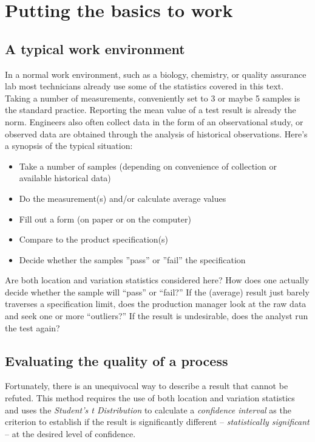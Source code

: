 \chapter{Putting the basics to work}

\section{A typical work environment}
In a normal work environment, such as a biology, chemistry, or quality assurance lab most technicians already use some of the statistics covered in this text.  Taking a number of measurements, conveniently set to 3 or maybe 5 samples is the standard practice.  Reporting the mean value of a test result is already the norm.  Engineers also often collect data in the form of an observational study, or observed data are obtained through the analysis of historical observations.
Here's a synopsis of the typical situation:
\begin{center}
  \begin{itemize}
  \item Take a number of samples (depending on convenience of collection or available historical data)
  \item Do the measurement(s) and/or calculate average values
  \item Fill out a form (on paper or on the computer)
  \item Compare to the product specification(s)
  \item Decide whether the samples ''pass'' or ''fail'' the specification
  \end{itemize}
\end{center}  
  
Are both location and variation statistics considered here?  How does one actually decide whether the sample will ``pass'' or ``fail?''  If the (average) result just barely traverses a specification limit, does the production manager look at the raw data and seek one or more ``outliers?''  If the result is undesirable, does the analyst run the test again?
  
\section{Evaluating the quality of a process}
Fortunately, there is an unequivocal way to describe a result that cannot be refuted.  This method requires the use of both location and variation statistics and uses the \textit{Student's t Distribution} to calculate a \textit{confidence interval} as the criterion to establish if the result is significantly different -- \textit{statistically significant} -- at the desired level of confidence.

